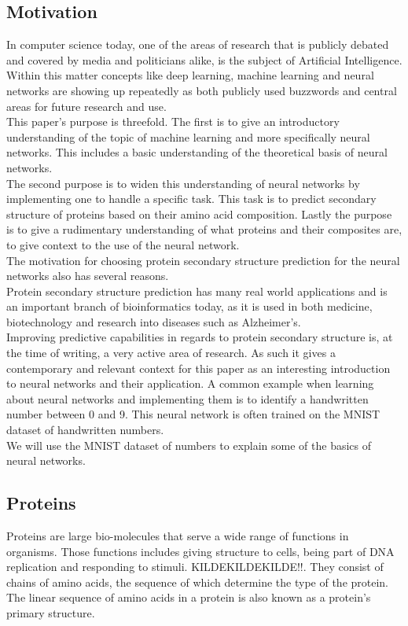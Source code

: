 \subsection{Motivation}
In computer science today, one of the areas of research that is publicly debated and covered by media and politicians alike, is the subject of Artificial Intelligence. Within this matter concepts like deep learning, machine learning and neural networks are showing up repeatedly as both publicly used buzzwords and central areas for future research and use.\\
This paper's purpose is threefold. The first is to give an introductory understanding of the topic of machine learning and more specifically neural networks. This includes a basic understanding of the theoretical basis of neural networks. \\
The second purpose is to widen this understanding of neural networks by implementing one to handle a specific task. This task is to predict secondary structure of proteins based on their amino acid composition. Lastly the purpose is to give a rudimentary understanding of what proteins and their composites are, to give context to the use of the neural network.\\
The motivation for choosing protein secondary structure prediction for the neural networks also has several reasons. \\
Protein secondary structure prediction has many real world applications and is an important branch of bioinformatics today, as it is used in both medicine, biotechnology and research into diseases such as Alzheimer's. \\
Improving predictive capabilities in regards to protein secondary structure is, at the time of writing, a very active area of research. As such it gives a contemporary and relevant context for this paper as an interesting introduction to neural networks and their application.   
A common example when learning about neural networks and implementing them is to identify a handwritten number between 0 and 9. This neural network is often trained on the MNIST dataset of handwritten numbers. \\
We will use the MNIST dataset of numbers to explain some of the basics of neural networks. 


\subsection{Proteins}
Proteins are large bio-molecules that serve a wide range of functions in organisms. Those functions includes giving structure to cells, being part of DNA replication and responding to stimuli. KILDEKILDEKILDE!!. They consist of chains of amino acids, the sequence of which determine the type of the protein. The linear sequence of amino acids in a protein is also known as a protein's primary structure. 

